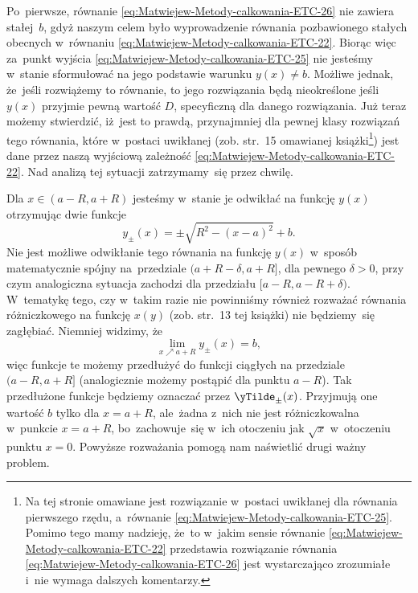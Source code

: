 \documentclass[a4paper,11pt]{article}
\numberwithin{equation}{section}
\begin{document}
Po~pierwsze, równanie \eqref{eq:Matwiejew-Metody-calkowania-ETC-26} nie
zawiera stałej~$b$, gdyż naszym celem było wyprowadzenie równania
pozbawionego stałych obecnych w~równaniu
\eqref{eq:Matwiejew-Metody-calkowania-ETC-22}. Biorąc więc za~punkt wyjścia
\eqref{eq:Matwiejew-Metody-calkowania-ETC-25} nie jesteśmy w~stanie
sformułować na jego podstawie warunku $y( x ) \neq b$. Możliwe jednak, że~jeśli
rozwiążemy to równanie, to jego rozwiązania będą nieokreślone jeśli $y( x )$
przyjmie pewną wartość $D$, specyficzną dla danego rozwiązania. Już teraz
możemy stwierdzić, iż~jest to prawdą, przynajmniej dla pewnej klasy
rozwiązań tego równania, które w~postaci uwikłanej (zob. str.~15 omawianej
książki\footnote{Na tej stronie omawiane jest rozwiązanie w~postaci
  uwikłanej dla równania pierwszego rzędu, a~równanie
  \eqref{eq:Matwiejew-Metody-calkowania-ETC-25}. Pomimo tego mamy nadzieję,
  że~to w~jakim sensie równanie
  \eqref{eq:Matwiejew-Metody-calkowania-ETC-22} przedstawia rozwiązanie
  równania \eqref{eq:Matwiejew-Metody-calkowania-ETC-26} jest wystarczająco
  zrozumiałe i~nie wymaga dalszych komentarzy.}) jest dane przez naszą
wyjściową zależność
\eqref{eq:Matwiejew-Metody-calkowania-ETC-22}. Nad analizą tej sytuacji
zatrzymamy~się przez chwilę.

Dla $x \in ( a - R, a + R )$ jesteśmy w~stanie je odwikłać na funkcję
$y( x )$ otrzymując dwie funkcje
\begin{equation}
  \label{eq:Uwagi-do-konkrentych-stron-07}
  y_{ \pm }( x ) = \pm\sqrt{ R^{ 2 } - ( x - a )^{ 2 } } + b.
\end{equation}
Nie jest możliwe odwikłanie tego równania na funkcję $y( x )$ w~sposób
matematycznie spójny na~przedziale $( a + R - \delta, a + R ]$, dla pewnego
$\delta > 0$, przy czym analogiczna sytuacja zachodzi dla przedziału
$[ a - R, a - R + \delta )$. W~tematykę tego, czy w~takim razie nie powinniśmy
również rozważać równania różniczkowego na funkcję $x( y )$ (zob. str.~13
tej książki) nie będziemy~się zagłębiać. Niemniej widzimy, że
\begin{equation}
  \label{eq:Uwagi-do-konkrentych-stron-08}
  \lim_{ x \nearrow a + R } y_{ \pm }( x ) = b,
\end{equation}
więc funkcje te możemy przedłużyć do funkcji ciągłych na przedziale
$( a - R, a + R ]$ (analogicznie możemy postąpić dla punktu $a - R$).
Tak przedłużone funkcje będziemy oznaczać przez $\yTilde_{ \pm }( x )$.
Przyjmują one wartość $b$ tylko dla $x = a + R$, ale~żadna z~nich nie jest
różniczkowalna w~punkcie $x = a + R$, bo~zachowuje~się w~ich otoczeniu jak
$\sqrt{ x }$ w~otoczeniu punktu $x = 0$. Powyższe rozważania pomogą nam
naświetlić drugi ważny problem.
\end{document}
